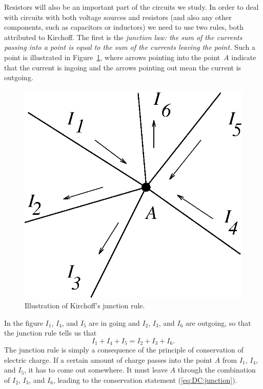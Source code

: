 Resistors will also be an important part of the circuits we study.  In order
to deal with circuits with both voltage sources and resistors (and also any
other components, such as capacitors or inductors) we need to use two rules,
both attributed to Kirchoff.  The first is the {\it junction law: the sum of 
the currents passing into a point is equal to the sum of the currents leaving 
the point.} Such a point is illustrated in Figure~\ref{fig:DC:junction}, where 
arrows pointing into the point~$A$ indicate that the current is ingoing and 
the arrows pointing out mean the current is outgoing. 
\begin{figure}
\centering \epsfxsize=4cm \includegraphics[scale=0.5]{2_dc/junction.eps}
\caption{Illustration of Kirchoff's junction rule.}
\label{fig:DC:junction}
\end{figure}
In the figure $I_1$, $I_4$, and $I_5$ are in going and $I_2$, $I_3$, and $I_6$ 
are outgoing, so that the junction rule tells us that
\begin{equation}
I_1+I_4+I_5=I_2+I_3+I_6. \label{eq:DC:junction}
\end{equation}  
The junction rule is simply a consequence of the principle of conservation of 
electric charge.  If a certain amount of charge passes into the point $A$ from
$I_1$, $I_4$, and $I_5$, it has to come out somewhere. It must leave $A$ 
through the combination of $I_2$, $I_3$, and $I_6$, leading to the conservation
statement (\ref{eq:DC:junction}). 

